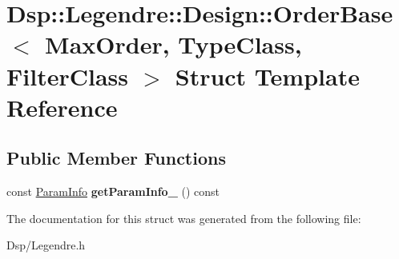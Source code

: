 \hypertarget{structDsp_1_1Legendre_1_1Design_1_1OrderBase}{\section{Dsp\-:\-:Legendre\-:\-:Design\-:\-:Order\-Base$<$ Max\-Order, Type\-Class, Filter\-Class $>$ Struct Template Reference}
\label{structDsp_1_1Legendre_1_1Design_1_1OrderBase}
}
\subsection*{Public Member Functions}
\begin{DoxyCompactItemize}
\item 
\hypertarget{structDsp_1_1Legendre_1_1Design_1_1OrderBase_a17cbaff7f5db223b9efbea62a409d754}{const \hyperlink{classDsp_1_1ParamInfo}{Param\-Info} {\bfseries get\-Param\-Info\-\_} () const }\label{structDsp_1_1Legendre_1_1Design_1_1OrderBase_a17cbaff7f5db223b9efbea62a409d754}

\end{DoxyCompactItemize}


The documentation for this struct was generated from the following file\-:\begin{DoxyCompactItemize}
\item 
Dsp/Legendre.\-h\end{DoxyCompactItemize}
